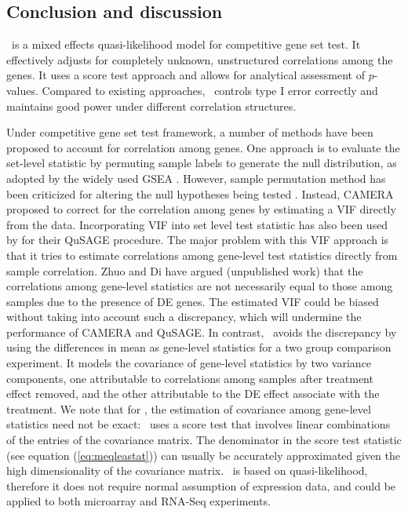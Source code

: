 	\subsection{Conclusion and discussion}\label{section:conclusion}
	
	 \OurMethod~is a mixed effects quasi-likelihood model for competitive gene set 
	test. It effectively adjusts for completely unknown, unstructured correlations among the genes. 
	It uses a score test approach and allows for analytical assessment of $p$-values. Compared to 
	existing approaches, \OurMethod~controls type I error correctly and maintains good power under 
	different correlation structures.  
	
	Under competitive gene set test framework, a number of methods have been
	proposed to account for correlation among genes. One approach is to evaluate the set-level 
	statistic
	by permuting sample labels to generate the null distribution, as adopted by the widely used GSEA
	\citep{subramanian2005gene}. However, sample permutation method has been criticized for  
	altering
	the null hypotheses being tested \citep{goeman2007analyzing, khatri2012ten}. Instead, CAMERA
	\citep{wu2012camera} proposed to correct for the correlation among genes by estimating a VIF
	directly from the data. Incorporating VIF into set level test statistic has also been used by 
	\citet{yaari2013quantitative} for their QuSAGE procedure. The major problem with this VIF
	approach is that it tries to estimate correlations
	among gene-level test statistics directly from sample correlation. Zhuo and Di have
	argued (unpublished work) that the correlations among gene-level statistics are not necessarily
	equal to those among samples due to the presence of DE genes. The estimated VIF could be biased
	without taking into account such a discrepancy, which will undermine the performance of 
	CAMERA and QuSAGE. In contrast, \OurMethod~avoids the discrepancy by using the differences in 
	mean as gene-level statistics
	for a two group comparison experiment. It models the covariance of gene-level statistics by two
	variance components, one attributable to correlations among samples after treatment effect 
	removed,
	and the other attributable to the DE effect associate with the treatment. We note that for
	\OurMethod, the estimation of covariance among gene-level statistics need not be exact:
	\OurMethod~uses a score test that involves linear combinations of the entries of the covariance
	matrix. The denominator in the score test statistic (see equation (\ref{eq:meqleastat})) can 
	usually be accurately 
	approximated
	given the high dimensionality of the covariance matrix. \OurMethod~is based on quasi-likelihood,
	therefore it does not require normal assumption of expression data, and could be applied to both
	microarray and RNA-Seq experiments. 
	
